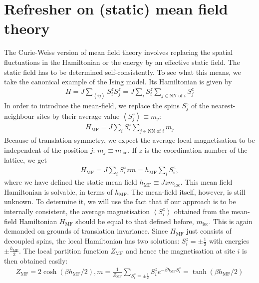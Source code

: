 \documentclass[12pt,onecolumn]{revtex4-2}
\begin{document}
\section{Refresher on (static) mean field theory}\label{ising_section}
The Curie-Weiss version of mean field theory involves replacing the spatial fluctuations in the Hamiltonian or the energy by an effective static field. The static field has to be determined self-consistently. To see what this means, we take the canonical example of the Ising model. Its Hamiltonian is given by
\begin{equation}\begin{aligned}
	H = J\sum_{\left<ij \right>} S_i^z S_j^z = J\sum_i S_i^z \sum_{j \in \text{NN of }i}S_j^z
\end{aligned}\end{equation}
In order to introduce the mean-field, we replace the spins \(S_j^z\) of the nearest-neighbour sites by their average value \(\left<S_j^z\right> \equiv m_j\):
\begin{equation}\begin{aligned}
	H_\text{MF} = J\sum_i S_i^z \sum_{j \in \text{NN of }i}m_j
\end{aligned}\end{equation}
Because of translation symmetry, we expect the average local magnetisation to be independent of the position \(j\): \(m_j \equiv m_\text{loc}\). If \(z\) is the coordination number of the lattice, we get
\begin{equation}\begin{aligned}
	H_\text{MF} = J\sum_i S_i^z z m = h_\text{MF} \sum_i S_i^z,
\end{aligned}\end{equation}
where we have defined the static mean field \(h_\text{MF} \equiv Jzm_\text{loc}\). This mean field Hamiltonian is solvable, in terms of \(h_\text{MF}\). The mean-field itself, however, is still unknown. To determine it, we will use the fact that if our approach is to be internally consistent, the average magnetisation \(\left<S_i^z \right>\) obtained from the mean-field Hamiltonian \(H_\text{MF}\) should be equal to that defined before, \(m_\text{loc}\). This is again demanded on grounds of translation invariance. Since \(H_\text{MF}\) just consists of decoupled spins, the local Hamiltonian has two solutions: \(S_i^z = \pm \frac{1}{2}\) with energies \(\pm \frac{h_\text{MF}}{2}\). The local partition function \(Z_\text{MF}\) and hence the magnetisation at site \(i\) is then obtained easily:
\begin{equation}\begin{aligned}
	Z_\text{MF} = 2\cosh \left(\beta h_\text{MF}/2\right), m = \frac{1}{Z_\text{MF}}\sum_{S_i^z = \pm \frac{1}{2}} S_i^z e^{-\beta h_\text{MF}S_i^z} = \tanh \left(\beta h_\text{MF}/2\right)
\end{aligned}\end{equation}
\end{document}
